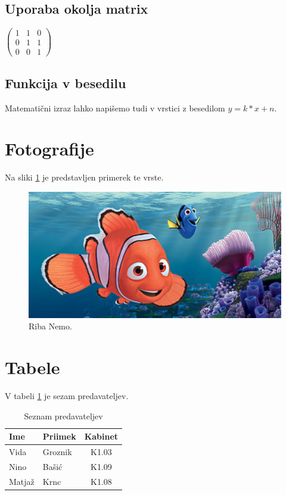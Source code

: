 \documentclass{article}
\begin{document}
\subsection{Uporaba okolja matrix}

$
\left(
\begin{matrix}
1 & 1 & 0 \\
0 & 1 & 1 \\
0 & 0 & 1
\end{matrix}
\right)
$

\subsection{Funkcija v besedilu}
Matematični izraz lahko napišemo tudi v vrstici z besedilom $y = k*x + n$.

\section{Fotografije}
Na sliki \ref{fig:nemo} je predstavljen primerek te vrste.

\begin{figure}[h]
    \centering
    \includegraphics[width=\linewidth]{nemo.jpg}
    \caption{Riba Nemo.}
    \label{fig:nemo}
\end{figure}

\section{Tabele}
\label{sec:Tabela}
V tabeli \ref{tab:predavatelji} je sezam predavateljev.

\begin{table}[]
    \centering
    \begin{tabular}{l l|c}
        \hline
        \textbf{Ime} & \textbf{Priimek} & \textbf{Kabinet}\\
        \hline \hline
        Vida & Groznik & K1.03 \\
        Nino & Bašić & K1.09 \\
        Matjaž & Krnc & K1.08 \\
        \hline
    \end{tabular}
    \caption{Seznam predavateljev}
    \label{tab:predavatelji}
\end{table}
\end{document}
